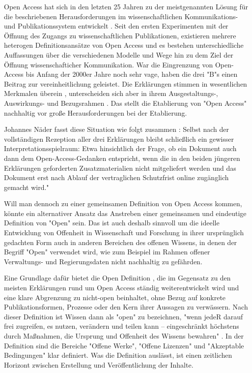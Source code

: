 Open Access hat sich in den letzten 25 Jahren zu der meistgenannten Lösung für die beschriebenen Herausforderungen im wissenschaftlichen Kommunikations- und Publikationssystem entwickelt \cite{brembs2015open}. Seit den ersten Experimenten mit der Öffnung des Zugangs zu wissenschaftlichen Publikationen, existieren mehrere heterogen Definitionsansätze von Open Access und es bestehen unterschiedliche Auffassungen über die verschiedenen Modelle und Wege hin zu dem Ziel der Öffnung wissenschafticher Kommunikation. War die Eingrenzung von Open-Access bis Anfang der 2000er Jahre noch sehr vage, haben die drei "B"s einen Beitrag zur vereinheitlichung geleistet. Die Erklärungen stimmen in wesentlichen Merkmalen überein \cite{albert_2006_open_implications}, unterscheiden sich aber in ihrem Ausgestaltungs-, Auswirkungs- und Bezugsrahmen \cite{naeder_2010_open}. Das stellt die Etablierung von "Open Access" nachhaltig vor große Herausforderungen bei der Etablierung.

Johannes Näder fasst diese Situation wie folgt zusammen \cite{naeder_2010_open}:
Selbst nach der vollständigen Rezeption aller drei Erklärungen bleibt schließlich ein gewisser Interpretationsspielraum: Etwa hinsichtlich der Frage, ob ein Dokument auch dann dem Open-Access-Gedanken entspricht, wenn die in den beiden jüngeren Erklärungen geforderten Zusatzmaterialien nicht mitgeliefert werden und das Dokument erst nach Ablauf der vertraglichen Schutzfrist online zugänglich gemacht wird."

Will man dennoch zu einer gemeinsamen Definition von Open Access kommen, könnte ein alternativer Ansatz das Anstreben einer gemeinsamen und eindeutige Definition von "Open" sein. Das ist auch deshalb sinnvoll um die ideelle Entwicklung von Offenheit in Wissenschaft und Forschung in ihrer ursprünglich gedachten Form auch in anderen Bereichen des offenen Wissens, in denen der Begriff "Open" verwendet wird, wie zum Beispiel im Rahmen offener Verwaltungs- und Regierungsdaten nicht nachhaltig zu gefährden.

Eine Grundlage dafür bietet die Open Definition \cite{open_definition}, die im Gegensatz zu den meisten Erklärungen rund um Open Access ständig weiterentwickelt wird und eine klare Abgrenzung zu nicht-open beinhaltet, ohne Bezug auf konkrete Publikationsformen, Prozesse oder den Kern ihrer Aussagen zu verwässern. Nach dieser Definition ist Wissen dann als "open" zu bezeichnen, "wenn jedeR darauf frei zugreifen, es nutzen, verändern und teilen kann – eingeschränkt höchstens durch Maßnahmen, die Ursprung und Offenheit des Wissens bewahren" \cite{open_definition}. In der Definition sind die Bereiche "Offene Werke", "Offene Lizenzen" und "Akzeptable Bedingungen" klar definiert. Was die Definition auslässt, ist einen zeitlichen Horizont zwischen Erstellung und Veröffentlichung der Inhalte.

